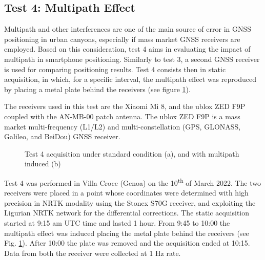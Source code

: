 \subsection{Test 4: Multipath Effect}
Multipath and other interferences are one of the main source of error in GNSS positioning in urban canyons, 
especially if mass market GNSS receivers are employed. Based on this consideration, test 4 aims in evaluating 
the impact of multipath  in smartphone positioning. Similarly to test 3, a second GNSS receiver is used for comparing 
positioning results. Test 4 consists then in static acquisition, in which, for a specific interval, the multipath effect 
was reproduced by placing a metal plate behind the receivers (see figure \ref{FIG:test4_setup}).

The receivers used in this test are the Xiaomi Mi 8, and the ublox ZED F9P coupled with the AN-MB-00 patch antenna. The ublox ZED F9P is a mass market multi-frequency (L1/L2) and multi-constellation (GPS, GLONASS, Galileo, and BeiDou) GNSS receiver.

\begin{figure}[H] 
	\centering
    \caption{Test 4 acquisition under standard condition (a), and with multipath induced (b)}
	\label{FIG:test4_setup} 
\end{figure}

Test 4 was performed in Villa Croce (Genoa) on the 10\textsuperscript{th} of March 2022. 
The two receivers were placed in a point whose coordinates were determined with high precision in NRTK modality using  the Stonex S70G receiver, and exploiting the Ligurian NRTK network for the differential corrections. The static acquisition started at 9:15 am UTC time and lasted 1 hour. From 9:45 to 10:00 the multipath effect was induced placing the metal plate behind the receivers (see Fig. \ref{FIG:test4_setup}). After 10:00 the plate was removed and the acquisition ended at 10:15. Data from both the receiver were 
collected at 1 Hz rate.

